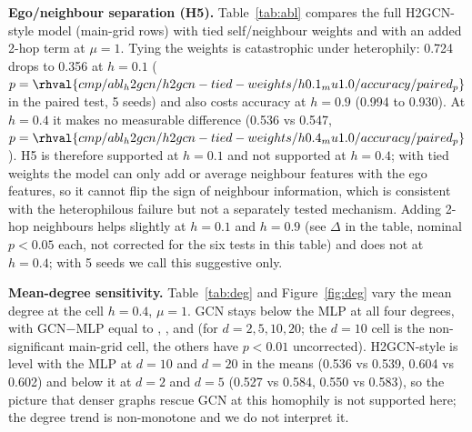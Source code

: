 \textbf{Ego/neighbour separation (H5).} Table~\ref{tab:abl} compares the full H2GCN-style model (main-grid rows) with tied self/neighbour weights and with an added 2-hop term at $\mu=1$. Tying the weights is catastrophic under heterophily: 0.724 drops to 0.356 at $h=0.1$ ($p=\rhval{cmp/abl_h2gcn/h2gcn-tied-weights/h0.1_mu1.0/accuracy/paired_p}$ in the paired test, 5 seeds) and also costs accuracy at $h=0.9$ (0.994 to 0.930). At $h=0.4$ it makes no measurable difference (0.536 vs 0.547, $p=\rhval{cmp/abl_h2gcn/h2gcn-tied-weights/h0.4_mu1.0/accuracy/paired_p}$). H5 is therefore supported at $h=0.1$ and not supported at $h=0.4$; with tied weights the model can only add or average neighbour features with the ego features, so it cannot flip the sign of neighbour information, which is consistent with the heterophilous failure but not a separately tested mechanism. Adding 2-hop neighbours helps slightly at $h=0.1$ and $h=0.9$ (see $\Delta$ in the table, nominal $p<0.05$ each, not corrected for the six tests in this table) and does not at $h=0.4$; with 5 seeds we call this suggestive only.

\begin{table}[t]\centering\caption{Ablation of H2GCN-style at $\mu=1$ (test accuracy mean $\pm$ std over 5 seeds; $p$ from a paired $t$-test against the full model; $\Delta$ is the full model minus the variant, so a negative $\Delta$ means the variant is better).}\label{tab:abl}
\small\end{table}

\textbf{Mean-degree sensitivity.} Table~\ref{tab:deg} and Figure~\ref{fig:deg} vary the mean degree at the cell $h=0.4$, $\mu=1$. GCN stays below the MLP at all four degrees, with GCN$-$MLP equal to , ,  and  (for $d=2,5,10,20$; the $d=10$ cell is the non-significant main-grid cell, the others have $p<0.01$ uncorrected). H2GCN-style is level with the MLP at $d=10$ and $d=20$ in the means (0.536 vs 0.539, 0.604 vs 0.602) and below it at $d=2$ and $d=5$ (0.527 vs 0.584, 0.550 vs 0.583), so the picture that denser graphs rescue GCN at this homophily is not supported here; the degree trend is non-monotone and we do not interpret it.

\begin{table}[t]\centering\caption{Mean-degree sweep at $h=0.4$, $\mu=1$ (accuracy mean $\pm$ std, 5 seeds).}\label{tab:deg}
\resizebox{\columnwidth}{!}{}\end{table}

